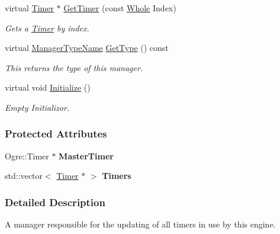 \begin{DoxyCompactItemize}
virtual \hyperlink{classMezzanine_1_1Timer}{Timer} $\ast$ \hyperlink{classMezzanine_1_1TimerManager_a8e546d703c06c261771ce1cc3ac40779}{GetTimer} (const \hyperlink{namespaceMezzanine_adcbb6ce6d1eb4379d109e51171e2e493}{Whole} Index)
\begin{DoxyCompactList}\small\item\em Gets a \hyperlink{classMezzanine_1_1Timer}{Timer} by index. \item\end{DoxyCompactList}\item 
virtual \hyperlink{classMezzanine_1_1ManagerBase_a08cecf5169cad3e82be81a3a159b0b6e}{ManagerTypeName} \hyperlink{classMezzanine_1_1TimerManager_ad62b8c89fa33085768284781aa28116a}{GetType} () const 
\begin{DoxyCompactList}\small\item\em This returns the type of this manager. \item\end{DoxyCompactList}\item 
virtual void \hyperlink{classMezzanine_1_1TimerManager_ac670fd396b7fb2b7f8d7c67bb95582ba}{Initialize} ()
\begin{DoxyCompactList}\small\item\em Empty Initializor. \item\end{DoxyCompactList}\end{DoxyCompactItemize}
\subsubsection*{Protected Attributes}
\begin{DoxyCompactItemize}
\item 
\hypertarget{classMezzanine_1_1TimerManager_afe3ae7f4576617932bad04a4ed71bdcc}{
Ogre::Timer $\ast$ {\bfseries MasterTimer}}
\label{classMezzanine_1_1TimerManager_afe3ae7f4576617932bad04a4ed71bdcc}

\item 
\hypertarget{classMezzanine_1_1TimerManager_a15adf15b21e6956902fe758a2dbea0e6}{
std::vector$<$ \hyperlink{classMezzanine_1_1Timer}{Timer} $\ast$ $>$ {\bfseries Timers}}
\label{classMezzanine_1_1TimerManager_a15adf15b21e6956902fe758a2dbea0e6}

\end{DoxyCompactItemize}


\subsubsection{Detailed Description}
A manager responsible for the updating of all timers in use by this engine. 

